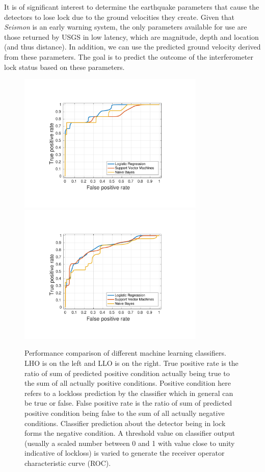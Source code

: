 \documentclass[twocolumn, aps, superscriptaddress]{revtex4}
\begin{document}
It is of significant interest to determine the earthquake parameters that cause the detectors to lose lock due to the ground velocities they create.
Given that \emph{Seismon} is an early warning system, the only parameters available for use are those returned by USGS in low latency, which are magnitude, depth and location (and thus distance). 
In addition, we can use the predicted ground velocity derived from these parameters.
The goal is to predict the outcome of the interferometer lock status based on these parameters.

\begin{figure}[t]
\hspace*{-0.5cm}
 \includegraphics[width=3.5in, trim = 2.5cm 1.5cm 2.5cm 1.5cm, clip=true]{lho_lockloss_ROC.pdf}
  \includegraphics[width=3.5in, trim = 2.5cm 1.5cm 2.5cm 1.5cm, clip=true]{llo_lockloss_ROC.pdf}
 \caption{Performance comparison of different machine learning classifiers. LHO is on the left and LLO is on the right. True positive rate is the ratio of sum of predicted positive condition actually being true to the sum of all actually positive conditions. Positive condition here refers to a lockloss prediction by the classifier which in general can be true or false. False positive rate is the ratio of sum of predicted positive condition being false to the sum of all actually negative conditions. Classifier prediction about the detector being in lock forms the negative condition. A threshold value on classifier output (usually a scaled number between 0 and 1 with value close to unity indicative of lockloss) is varied to generate the receiver operator characteristic curve (ROC).
 }
 \label{fig:MLA_comparison}
\end{figure}
\end{document}
